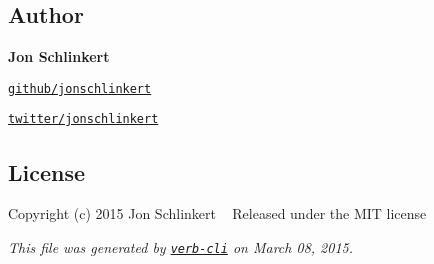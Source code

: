 \subsection*{Author}

{\bfseries Jon Schlinkert}


\begin{DoxyItemize}
\item \href{https://github.com/jonschlinkert}{\tt github/jonschlinkert}
\item \href{http://twitter.com/jonschlinkert}{\tt twitter/jonschlinkert}
\end{DoxyItemize}

\subsection*{License}

Copyright (c) 2015 Jon Schlinkert ~\newline
Released under the M\+IT license





{\itshape This file was generated by \href{https://github.com/assemble/verb-cli}{\tt verb-\/cli} on March 08, 2015.} 